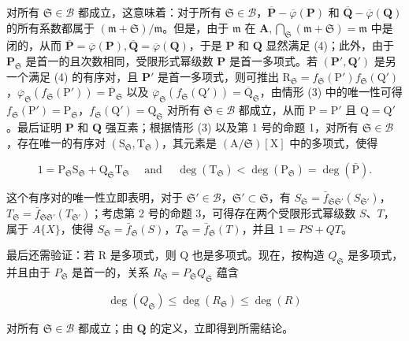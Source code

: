 对所有 \(\mathfrak{S} \in \mathcal{B}\) 都成立，这意味着：对于所有 \(\mathfrak{S} \in \mathcal{B}\)，\(\overline{\mathbf{P}} - \overline{\varphi}(\mathbf{P})\) 和 \(\overline{\mathbf{Q}} - \overline{\varphi}(\mathbf{Q})\) 的所有系数都属于 \((\mathfrak{m} + \mathfrak{S})/\mathfrak{m}\)。但是，由于 \(\mathfrak{m}\) 在 \(\mathbf{A}, \bigcap_{\mathfrak{S}} (\mathfrak{m} + \mathfrak{S}) = \mathfrak{m}\) 中是闭的，从而 \(\overline{\mathbf{P}} = \overline{\varphi}(\mathbf{P}), \overline{\mathbf{Q}} = \overline{\varphi}(\mathbf{Q})\)，于是 \(\mathbf{P}\) 和 \(\mathbf{Q}\) 显然满足 (4)；此外，由于 \(\mathbf{P}_{\mathfrak{S}}\) 是首一的且次数相同，受限形式幂级数 \(\mathbf{P}\) 是首一多项式。若 \((\mathbf{P}', \mathbf{Q}')\) 是另一个满足 (4) 的有序对，且 \(\mathbf{P}'\) 是首一多项式，则可推出 \(\mathrm{R}_{\mathfrak{S}} = f_{\mathfrak{S}}(\mathrm{P}') f_{\mathfrak{S}}(\mathrm{Q}')\)，\(\overline{\varphi}_{\mathfrak{S}}(f_{\mathfrak{S}}(\mathrm{P}')) = \overline{\mathrm{P}}_{\mathfrak{S}}\) 以及 \(\overline{\varphi}_{\mathfrak{S}}(f_{\mathfrak{S}}(\mathrm{Q}')) = \overline{\mathrm{Q}}_{\mathfrak{S}}\)，由情形 (3) 中的唯一性可得 \(f_{\mathfrak{S}}(\mathrm{P}') = \mathrm{P}_{\mathfrak{S}}\)，\(f_{\mathfrak{S}}(\mathrm{Q}') = \mathrm{Q}_{\mathfrak{S}}\) 对所有 \(\mathfrak{S} \in \mathcal{B}\) 都成立，从而 \(\mathrm{P} = \mathrm{P}'\) 且 \(\mathrm{Q} = \mathrm{Q}'\)。最后证明 \(\mathbf{P}\) 和 \(\mathbf{Q}\) 强互素；根据情形 (3) 以及第 1 号的命题 1，对所有 \(\mathfrak{S} \in \mathcal{B}\)，存在唯一的有序对 \((\mathrm{S}_{\mathfrak{S}}, \mathrm{T}_{\mathfrak{S}})\)，其元素是 \((\mathrm{A}/\mathfrak{S})[\mathrm{X}]\) 中的多项式，使得

\[
1 = \mathrm{P} _ {\mathfrak {S}} \mathrm{S} _ {\mathfrak {S}} + \mathrm{Q} _ {\mathfrak {S}} \mathrm{T} _ {\mathfrak {S}} \quad \text { and } \quad \deg (\mathrm{T} _ {\mathfrak {S}}) <   \deg (\mathrm{P} _ {\mathfrak {S}}) = \deg (\bar {\mathrm{P}}).\tag{7}
\]

这个有序对的唯一性立即表明，对于 \(\mathfrak{S}' \in \mathcal{B}\)，\(\mathfrak{S}' \subset \mathfrak{S}\)，有 \(S_{\mathfrak{S}} = \bar{f}_{\mathfrak{S}\mathfrak{S}'}(S_{\mathfrak{S}'})\)，\(T_{\mathfrak{S}} = \bar{f}_{\mathfrak{S}\mathfrak{S}'}(T_{\mathfrak{S}'})\)；考虑第 2 号的命题 3，可得存在两个受限形式幂级数 \(S\)、\(T\)，属于 \(A\{X\}\)，使得 \(S_{\mathfrak{S}} = \bar{f}_{\mathfrak{S}}(S)\)，\(T_{\mathfrak{S}} = \bar{f}_{\mathfrak{S}}(T)\)，并且 \(1 = PS + QT\)。

最后还需验证：若 R 是多项式，则 Q 也是多项式。现在，按构造 \(Q_{\mathfrak{S}}\) 是多项式，并且由于 \(P_{\mathfrak{S}}\) 是首一的，关系 \(R_{\mathfrak{S}} = P_{\mathfrak{S}}Q_{\mathfrak{S}}\) 蕴含

\[
\deg (Q _ {\mathfrak {S}}) \leqslant \deg (R _ {\mathfrak {S}}) \leqslant \deg (R)
\]

对所有 \(\mathfrak{S} \in \mathcal{B}\) 都成立；由 \(\mathbf{Q}\) 的定义，立即得到所需结论。
\relax{}
